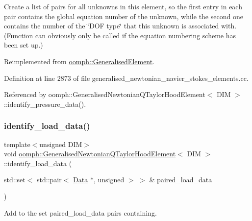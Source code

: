 Create a list of pairs for all unknowns in this element, so the first entry in each pair contains the global equation number of the unknown, while the second one contains the number of the \char`\"{}\+D\+O\+F type\char`\"{} that this unknown is associated with. (Function can obviously only be called if the equation numbering scheme has been set up.) 

Reimplemented from \hyperlink{classoomph_1_1GeneralisedElement_a069f59bfc3e607a5bebba52c6314d777}{oomph\+::\+Generalised\+Element}.



Definition at line 2873 of file generalised\+\_\+newtonian\+\_\+navier\+\_\+stokes\+\_\+elements.\+cc.



Referenced by oomph\+::\+Generalised\+Newtonian\+Q\+Taylor\+Hood\+Element$<$ D\+I\+M $>$\+::identify\+\_\+pressure\+\_\+data().

\mbox{\label{classoomph_1_1GeneralisedNewtonianQTaylorHoodElement_a93fa12a6111a676cb6e7ac2528266d07}} 
\subsubsection{\texorpdfstring{identify\+\_\+load\+\_\+data()}{identify\_load\_data()}}
{\footnotesize\ttfamily template$<$unsigned D\+IM$>$ \\
void \hyperlink{classoomph_1_1GeneralisedNewtonianQTaylorHoodElement}{oomph\+::\+Generalised\+Newtonian\+Q\+Taylor\+Hood\+Element}$<$ D\+IM $>$\+::identify\+\_\+load\+\_\+data (\begin{DoxyParamCaption}\item[{std\+::set$<$ std\+::pair$<$ \hyperlink{classoomph_1_1Data}{Data} $\ast$, unsigned $>$ $>$ \&}]{paired\+\_\+load\+\_\+data }\end{DoxyParamCaption})\hspace{0.3cm}{\ttfamily [virtual]}}



Add to the set {\ttfamily paired\+\_\+load\+\_\+data} pairs containing. 


